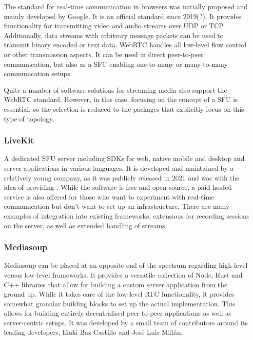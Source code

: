 The standard for real-time communication in browsers was initially proposed and mainly developed by Google. It is an official standard since 2019(?). It provides functionality for transmitting video and audio streams over \ac{UDP} or \ac{TCP}. Additionally, data streams with arbitrary message packets can be used to transmit binary encoded or text data. WebRTC handles all low-level flow control or other transmission aspects. It can be used in direct peer-to-peer communication, but also as a \ac{SFU} enabling one-to-many or many-to-many communication setups.

Quite a number of software solutions for streaming media also support the WebRTC standard. However, in this case, focusing on the concept of a \ac{SFU} is essential, so the selection is reduced to the packages that explicitly focus on this type of topology.



\subsubsection{LiveKit}

A dedicated \ac{SFU} server including \ac{SDK}s for web, native mobile and desktop and server applications in various languages. It is developed and maintained by a relatively young company, as it was publicly released in 2021 and was  with the idea of providing  \parencite{livekitAbout}. While the software is free and open-source, a paid hosted service is also offered for those who want to experiment with real-time communication but don't want to set up an infrastructure. There are many examples of integration into existing frameworks, extensions for recording sessions on the server, as well as extended handling of streams.

\subsubsection{Mediasoup}

Mediasoup can be placed at an opposite end of the spectrum regarding high-level versus low-level frameworks. It provides a versatile collection of Node, Rust and C++ libraries that allow for building a custom server application from the ground up. While it takes care of the low-level \ac{RTC} functionality, it provides somewhat granular building blocks to set up the actual implementation. This allows for building entirely decentralised peer-to-peer applications as well as server-centric setups. It was developed by a small team of contributors around its leading developers, Iñaki Baz Castillo and José Luis Millán.


